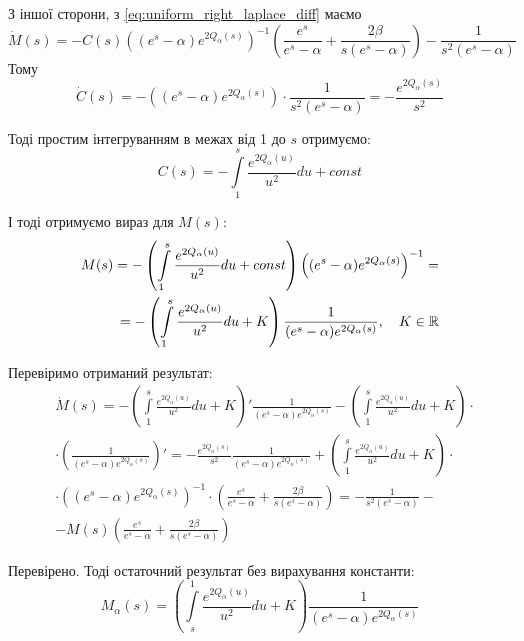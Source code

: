 З іншої сторони, з \eqref{eq:uniform_right_laplace_diff} маємо
$$
	 \dot M(s) = - C(s) \left((e^s - \alpha)  e^{2Q_\alpha(s)}\right)^{-1}  \left(\frac{e^s}{e^s - \alpha} + \frac{2\beta}{s(e^s - \alpha)}\right) - \frac{1}{s^2(e^s - \alpha)} \quad	
$$
Тому
$$
	\dot C(s) = - \left((e^s - \alpha)  e^{2Q_\alpha(s)}\right) \cdot  \frac{1}{s^2(e^s - \alpha)} =  - \frac{e^{2Q_\alpha(s)}}{s^2}
$$

Тоді простим інтегруванням в межах від 1 до $s$ отримуємо:
\begin{equation}
	C(s) = -  \int\limits_1^s \frac{e^{2Q_\alpha(u)}}{u^2} du + const
\end{equation}

І тоді отримуємо вираз для $M(s)$:
\begin{equation}
\begin{split}
	M(s)=- \left( \int\limits_1^s \frac{e^{2Q_\alpha(u)}}{u^2} du + const \right) \left((e^s - \alpha)  e^{2Q_\alpha(s)}\right)^{-1}  =\\
	= - \left( \int\limits_1^s \frac{e^{2Q_\alpha(u)}}{u^2} du + K \right) \frac{1}{(e^s - \alpha)  e^{2Q_\alpha(s)}}, \quad K \in \mathbb{R}
\end{split}
\end{equation}

Перевіримо отриманий результат:
\begin{equation*}
\begin{split}
	&\dot M(s) = -\left( \int\limits_1^s \frac{e^{2Q_\alpha(u)}}{u^2} du + K \right)' \frac{1}{(e^s - \alpha)  e^{2Q_\alpha(s)}} -\left( \int\limits_1^s \frac{e^{2Q_\alpha(u)}}{u^2} du + K \right)\cdot \\ 
	&\cdot \left(\frac{1}{(e^s - \alpha)  e^{2Q_\alpha(s)}}\right)' = -\frac{e^{2Q_\alpha(s)}}{s^2} \frac{1}{(e^s - \alpha)  e^{2Q_\alpha(s)}}  + \left( \int\limits_1^s \frac{e^{2Q_\alpha(u)}}{u^2} du + K \right) \cdot \\
	& \cdot \left((e^s - \alpha)  e^{2Q_\alpha(s)}\right)^{-1} \cdot \left(\frac{e^s}{e^s - \alpha}  + \frac{2\beta}{s(e^s - \alpha)}   \right)= -\frac{1}{s^2(e^s - \alpha)} -\\
	&- M(s)\left(\frac{e^s}{e^s - \alpha}  + \frac{2\beta}{s(e^s - \alpha)}   \right)
\end{split}
\end{equation*}

Перевірено. Тоді остаточний результат без вирахування константи:
\begin{equation}
	\label{eq:uniform_right_laplace_sol_initial}
	M_\alpha(s)= \left( \int\limits_s^1 \frac{e^{2Q_\alpha(u)}}{u^2} du + K \right) \frac{1}{(e^s - \alpha)  e^{2Q_\alpha(s)}}
\end{equation}

